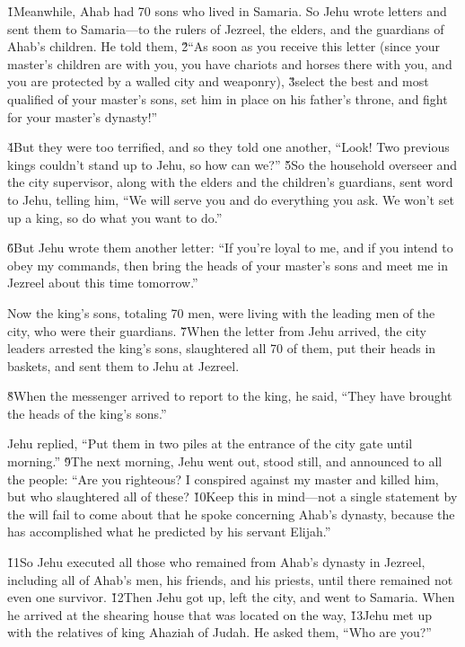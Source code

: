 \v{1}Meanwhile, Ahab had 70 sons who lived in Samaria. So Jehu wrote letters and sent them to Samaria---to the rulers of Jezreel, the elders, and the guardians of Ahab's children. He told them, \v{2}``As soon as you receive this letter (since your master's children are with you, you have chariots and horses there with you, and you are protected by a walled city and weaponry), \v{3}select the best and most qualified of your master's sons, set him in place on his father's throne, and fight for your master's dynasty!''

\v{4}But they were too terrified, and so they told one another, ``Look! Two previous kings couldn't stand up to Jehu, so how can we?'' \v{5}So the household overseer and the city supervisor, along with the elders and the children's guardians, sent word to Jehu, telling him, ``We will serve you and do everything you ask. We won't set up a king, so do what you want to do.''

\v{6}But Jehu wrote them another letter: ``If you're loyal to me, and if you intend to obey my commands, then bring the heads of your master's sons and meet me in Jezreel about this time tomorrow.''

Now the king's sons, totaling 70 men, were living with the leading men of the city, who were their guardians. \v{7}When the letter from Jehu arrived, the city leaders arrested the king's sons, slaughtered all 70 of them, put their heads in baskets, and sent them to Jehu at Jezreel.

\v{8}When the messenger arrived to report to the king, he said, ``They have brought the heads of the king's sons.''

Jehu replied, ``Put them in two piles at the entrance of the city gate until morning.'' \v{9}The next morning, Jehu went out, stood still, and announced to all the people: ``Are you righteous? I conspired against my master and killed him, but who slaughtered all of these? \v{10}Keep this in mind---not a single statement by the  will fail to come about that he spoke concerning Ahab's dynasty, because the  has accomplished what he predicted by his servant Elijah.''

\v{11}So Jehu executed all those who remained from Ahab's dynasty in Jezreel, including all of Ahab's men, his friends, and his priests, until there remained not even one survivor. \v{12}Then Jehu got up, left the city, and went to Samaria. When he arrived at the shearing house that was located on the way, \v{13}Jehu met up with the relatives of king Ahaziah of Judah. He asked them, ``Who are you?''

